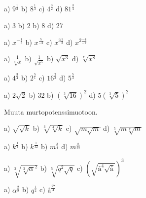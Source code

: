 \begin{tehtava}
a) $9^\frac{1}{2}$ \qquad
b) $8^\frac{1}{3}$ \qquad
c) $4^\frac{3}{2}$ \qquad
d) $81^\frac{3}{4}$ \qquad
\begin{vastaus}	
a) $3$ \qquad
b) $2$ \qquad
b) $8$ \qquad
d) $27$ 
\end{vastaus}
\end{tehtava}

\begin{tehtava}
a) $x^{-\frac{1}{3}}$ \qquad
b) $x^\frac{5}{-2}$ \qquad
c) $x^{3 \frac{1}{2}}$ \qquad
d) $x^{2 \frac{-4}{-7}}$ \qquad
\begin{vastaus}	
a) $\frac{1}{\sqrt[3]{x}}$ \qquad
b) $\frac{1}{\sqrt{x^5}}$ \qquad
b) $\sqrt{x^3}$ \qquad
d) $\sqrt[7]{x^8}$ 
\end{vastaus}
\end{tehtava}

\begin{tehtava}
a) $4^\frac{3}{4}$ \qquad
b) $2^\frac{5}{1}$ \qquad
c) $16^\frac{2}{3}$ \qquad
d) $5^\frac{5}{3}$ \qquad
\begin{vastaus}	
a) $2\sqrt{2}$ \qquad
b) $32$ \qquad
b) $(\sqrt[3]{16})^2$ \qquad
d) $5(\sqrt[3]{5})^2$ 
\end{vastaus}
\end{tehtava}

Muuta murtopotenssimuotoon.

\begin{tehtava}
a) $\sqrt{\sqrt{k}}$ \qquad
b) $\sqrt[3]{\sqrt[4]{k}}$ \qquad
c) $\sqrt{m\sqrt{m}}$ \qquad
d) $\sqrt[5]{m\sqrt[7]{m}}$ \qquad
\begin{vastaus}	
a) $k^\frac{1}{4}$ \qquad
b) $k^\frac{1}{12}$ \qquad
b) $m^\frac{3}{4}$ \qquad
d) $m^\frac{8}{35}$ 
\end{vastaus}
\end{tehtava}

\begin{tehtava}
a) $\sqrt[3]{\sqrt[3]{\alpha}^2}$ \qquad
b) $\sqrt[5]{q^2\sqrt{q}}$ \qquad
c) $\left(\sqrt{å^4\sqrt{å}}\right)^3$ \qquad
\begin{vastaus}	
a) $\alpha^\frac{2}{9}$ \qquad
b) $q^\frac{1}{2}$ \qquad
c) $å^\frac{27}{4}$
\end{vastaus}
\end{tehtava}

